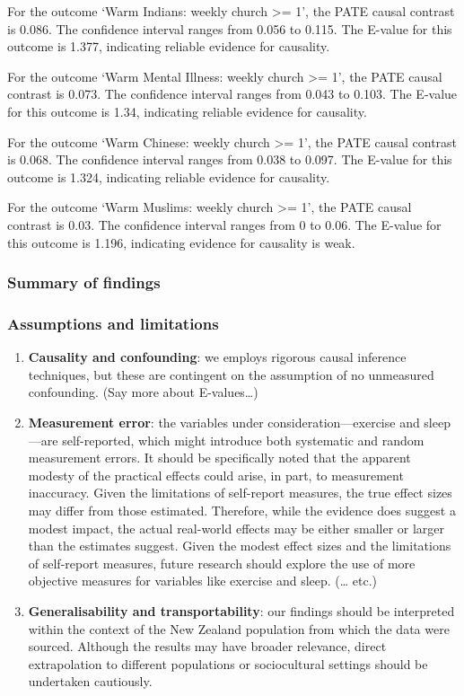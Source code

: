 \documentclass[
  singlecolumn]{article}
\begin{document}
For the outcome `Warm Indians: weekly church \textgreater= 1', the PATE
causal contrast is 0.086. The confidence interval ranges from 0.056 to
0.115. The E-value for this outcome is 1.377, indicating reliable
evidence for causality.

For the outcome `Warm Mental Illness: weekly church \textgreater= 1',
the PATE causal contrast is 0.073. The confidence interval ranges from
0.043 to 0.103. The E-value for this outcome is 1.34, indicating
reliable evidence for causality.

For the outcome `Warm Chinese: weekly church \textgreater= 1', the PATE
causal contrast is 0.068. The confidence interval ranges from 0.038 to
0.097. The E-value for this outcome is 1.324, indicating reliable
evidence for causality.

For the outcome `Warm Muslims: weekly church \textgreater= 1', the PATE
causal contrast is 0.03. The confidence interval ranges from 0 to 0.06.
The E-value for this outcome is 1.196, indicating evidence for causality
is weak.

\newpage{}

\subsubsection{Summary of findings}\label{summary-of-findings}

\subsubsection{Assumptions and
limitations}\label{assumptions-and-limitations}

\begin{enumerate}
\def\labelenumi{\arabic{enumi}.}
\item
  \textbf{Causality and confounding}: we employs rigorous causal
  inference techniques, but these are contingent on the assumption of no
  unmeasured confounding. (Say more about E-values\ldots)
\item
  \textbf{Measurement error}: the variables under
  consideration---exercise and sleep---are self-reported, which might
  introduce both systematic and random measurement errors. It should be
  specifically noted that the apparent modesty of the practical effects
  could arise, in part, to measurement inaccuracy. Given the limitations
  of self-report measures, the true effect sizes may differ from those
  estimated. Therefore, while the evidence does suggest a modest impact,
  the actual real-world effects may be either smaller or larger than the
  estimates suggest. Given the modest effect sizes and the limitations
  of self-report measures, future research should explore the use of
  more objective measures for variables like exercise and sleep.
  (\ldots{} etc.)
\item
  \textbf{Generalisability and transportability}: our findings should be
  interpreted within the context of the New Zealand population from
  which the data were sourced. Although the results may have broader
  relevance, direct extrapolation to different populations or
  sociocultural settings should be undertaken cautiously.
\end{enumerate}
\end{document}
